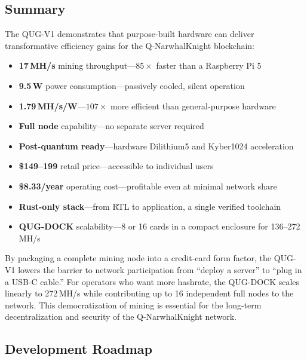 \documentclass[11pt,a4paper]{article}
\begin{document}
\subsection{Summary}

The QUG-V1 demonstrates that purpose-built hardware can deliver transformative efficiency gains for the Q-NarwhalKnight blockchain:

\begin{itemize}
    \item \textbf{17\,MH/s} mining throughput---$85\times$ faster than a Raspberry Pi 5
    \item \textbf{9.5\,W} power consumption---passively cooled, silent operation
    \item \textbf{1.79\,MH/s/W}---$107\times$ more efficient than general-purpose hardware
    \item \textbf{Full node} capability---no separate server required
    \item \textbf{Post-quantum ready}---hardware Dilithium5 and Kyber1024 acceleration
    \item \textbf{\$149--199} retail price---accessible to individual users
    \item \textbf{\$8.33/year} operating cost---profitable even at minimal network share
    \item \textbf{Rust-only stack}---from RTL to application, a single verified toolchain
    \item \textbf{QUG-DOCK} scalability---8 or 16 cards in a compact enclosure for 136--272\,MH/s
\end{itemize}

By packaging a complete mining node into a credit-card form factor, the QUG-V1 lowers the barrier to network participation from ``deploy a server'' to ``plug in a USB-C cable.'' For operators who want more hashrate, the QUG-DOCK scales linearly to 272\,MH/s while contributing up to 16 independent full nodes to the network. This democratization of mining is essential for the long-term decentralization and security of the Q-NarwhalKnight network.

\subsection{Development Roadmap}
\end{document}
